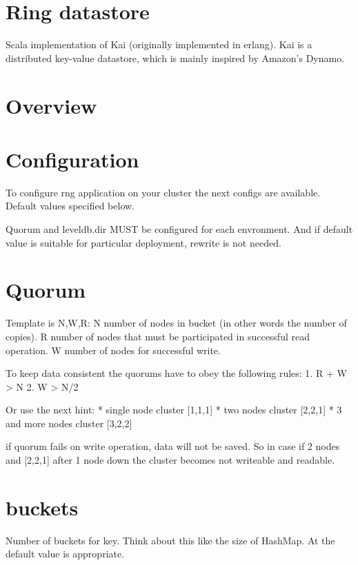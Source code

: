 \section*{Ring datastore}

Scala implementation of Kai (originally implemented in erlang).
Kai is a distributed key-value datastore, which is mainly inspired
by Amazon's Dynamo.

\section*{Overview}


\section*{Configuration}
To configure rng application on your cluster the next configs are available. Default values specified below.

Quorum and leveldb.dir MUST be configured for each envronment.
And if default value is suitable for particular deployment, rewrite is not needed.

\section*{Quorum}


Template is N,W,R: 
N \- number of nodes in bucket (in other words the number of copies). 
R \- number of nodes that must  be participated in successful read operation.
W \- number of nodes for successful write.

To keep data consistent the quorums have to obey the following rules:
1. R + W > N
2. W > N/2
   
Or use the next hint:
* single node cluster [1,1,1]
* two nodes cluster [2,2,1]
* 3 and more nodes cluster [3,2,2]


if quorum fails on write operation, data will not be saved. So in case if 2 nodes and [2,2,1] after 1 node down
the cluster becomes not writeable and readable.

\section*{buckets}

Number of buckets for key. Think about this like the size of HashMap. At the default value is appropriate.  

